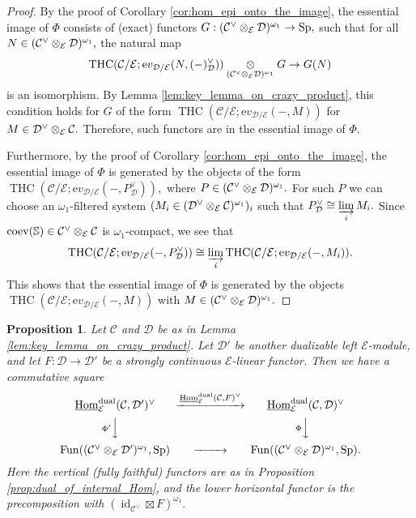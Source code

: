 \documentclass[11pt,leqno]{amsart}
\newtheorem{prop}[theo]{Proposition}
\numberwithin{equation}{section}
\def\bS{\mathbb{S}}
\def\Hom{\operatorname{Hom}}
\newcommand{\tens}[1]{%
  \mathbin{\mathop{\otimes}\displaylimits_{#1}}%
}
\newcommand{\indlim}[1][]{\mathop{\varinjlim}\limits_{#1}}
\newcommand{\dual}{\operatorname{dual}}
\newcommand{\ev}{\mathrm ev}
\newcommand{\cD}{{\mathcal D}}
\newcommand{\cC}{{\mathcal C}}
\newcommand{\cE}{{\mathcal E}}
\newcommand{\un}{\underline}
\newcommand{\THC}{\operatorname{THC}}
\newcommand{\Fun}{\operatorname{Fun}}
\newcommand{\Sp}{\operatorname{Sp}}
\newcommand{\id}{\operatorname{id}}
\newcommand{\coev}{\operatorname{coev}}
\begin{document}
\begin{proof} By the proof of Corollary \ref{cor:hom_epi_onto_the_image}, the essential image of $\Phi$ consists of (exact) functors $G:(\cC^{\vee}\tens{\cE}\cD)^{\omega_1}\to \Sp,$ such that for all $N\in (\cC^{\vee}\tens{\cE}\cD)^{\omega_1},$ the natural map
\begin{equation*}
\THC(\cC/\cE;\ev_{\cD/\cE}(N,(-)_{\cD}^{\vee}))\tens{(\cC^{\vee}\tens{\cE}\cD)^{\omega_1}} G\to G(N)
\end{equation*} 
is an isomorphism. By Lemma \ref{lem:key_lemma_on_crazy_product}, this condition holds for $G$ of the form $\THC(\cC/\cE;\ev_{\cD/\cE}(-,M))$ for $M\in\cD^{\vee}\tens{\cE}\cC.$ Therefore, such functors are in the essential image of $\Phi.$

Furthermore, by the proof of Corollary \ref{cor:hom_epi_onto_the_image}, the essential image of $\Phi$ is generated by the objects of the form $\THC(\cC/\cE;\ev_{\cD/\cE}(-,P_{\cD}^{\vee})),$ where $P\in (\cC^{\vee}\tens{\cE}\cD)^{\omega_1}.$ For such $P$ we can choose an $\omega_1$-filtered system $(M_i\in (\cD^{\vee}\tens{\cE}\cC)^{\omega_1})_i$ such that $P_{\cD}^{\vee}\cong\indlim[i] M_i.$ Since $\coev(\bS)\in\cC^{\vee}\tens{\cE}\cC$ is $\omega_1$-compact, we see that
\begin{equation*}
\THC(\cC/\cE;\ev_{\cD/\cE}(-,P_{\cD}^{\vee}))\cong \indlim[i] \THC(\cC/\cE;\ev_{\cD/\cE}(-,M_i)).
\end{equation*} 
This shows that the essential image of $\Phi$ is generated by the objects $\THC(\cC/\cE;\ev_{\cD/\cE}(-,M))$ with $M\in (\cC^{\vee}\tens{\cE}\cD)^{\omega_1}.$
\end{proof}

\begin{prop}\label{prop:comm_square_int_Homs} Let $\cC$ and $\cD$ be as in Lemma \ref{lem:key_lemma_on_crazy_product}. Let $\cD'$ be another dualizable left $\cE$-module, and let $F:\cD\to\cD'$ be a strongly continuous $\cE$-linear functor. Then we have a commutative square
\begin{equation}\label{eq:comm_square_int_Homs}
\begin{CD}
\un{\Hom}_{\cE}^{\dual}(\cC,\cD')^{\vee} @>{\un{\Hom}_{\cE}^{\dual}(\cC,F)^{\vee}}>> \un{\Hom}_{\cE}^{\dual}(\cC,\cD)^{\vee}\\
@V{\Phi'}VV @V{\Phi}VV\\
\Fun((\cC^{\vee}\tens{\cE}\cD')^{\omega_1},\Sp) @>>> \Fun((\cC^{\vee}\tens{\cE}\cD)^{\omega_1},\Sp).
\end{CD}	
\end{equation} 
Here the vertical (fully faithful) functors are as in Proposition \ref{prop:dual_of_internal_Hom}, and the lower horizontal functor is the precomposition with $(\id_{\cC^{\vee}}\boxtimes F)^{\omega_1}.$
\end{prop}
\end{document}
